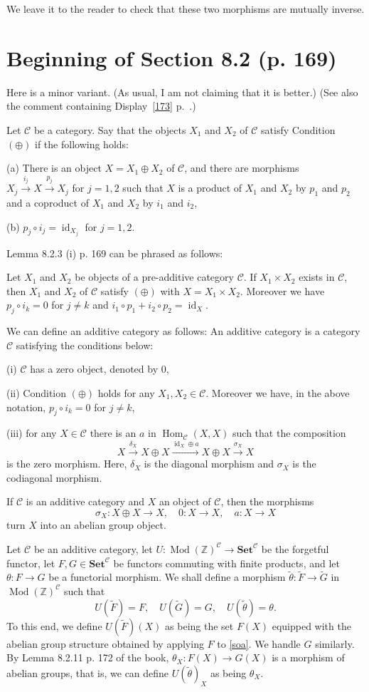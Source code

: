 \documentclass[12pt]{article}
\theoremstyle{remark}%
\newcommand{\n}{\noindent}
\newcommand{\C}{\mathcal C}
\newcommand{\Set}{\textbf{Set}}
\newcommand{\xr}{\xrightarrow}
\newcommand{\be}{\begin{equation}}
\newcommand{\ee}{\end{equation}}
\newcommand{\ccd}{the comment containing Display}
\DeclareMathOperator{\id}{id}
\DeclareMathOperator{\h}{Hom}
\DeclareMathOperator{\Mod}{Mod}
\begin{document}
We leave it to the reader to check that these two morphisms are mutually inverse. 
% 
\section{Beginning of Section 8.2 (p. 169)} \label{169}%
% 
Here is a minor variant. (As usual, I am not claiming that it is better.) (See also \ccd\ \eqref{173} p.~\pageref{173}.) 

Let $\C$ be a category. Say that the objects $X_1$ and $X_2$ of $\C$ satisfy Condition~$(\oplus)$ if the following holds: 

\n(a) There is an object $X=X_1\oplus X_2$ of $\C$, and there are morphisms $X_j\xr{i_j}X\xr{p_j}X_j$ for $j=1,2$ such that $X$ is a product of $X_1$ and $X_2$ by $p_1$ and $p_2$ and a coproduct of $X_1$ and $X_2$ by $i_1$ and $i_2$, 

\n(b) $p_j\circ i_j=\id_{X_j}$ for $j=1,2$. 

Lemma 8.2.3 (i) p. 169 can be phrased as follows: 

Let $X_1$ and $X_2$ be objects of a pre-additive category $\C$. If $X_1\times X_2$ exists in $\C$, then $X_1$ and $X_2$ of $\C$ satisfy $(\oplus)$ with $X=X_1\times X_2$. Moreover we have $p_j\circ i_k=0$ for $j\neq k$ and $i_1\circ p_1+i_2\circ p_2=\id_X$. 

We can define an additive category as follows: An additive category is a category $\C$ satisfying the conditions below: 

\n(i) $\C$ has a zero object, denoted by 0, 

\n(ii) Condition $(\oplus)$ holds for any $X_1,X_2\in\C$. Moreover we have, in the above notation, $p_j\circ i_k=0$ for $j\neq k$, 

\n(iii) for any $X\in\C$ there is an $a$ in $\h_\C(X,X)$ such that the composition 
$$ 
X\xr{\delta_X}X\oplus X\xr{\id_X\oplus a}X\oplus X\xr{\sigma_X}X 
$$ 
is the zero morphism. Here, $\delta_X$ is the diagonal morphism and $\sigma_X$ is the codiagonal morphism. 

If $\C$ is an additive category and $X$ an object of $\C$, then the morphisms 
% 
\be\label{soa} 
\sigma_X:X\oplus X\to X,\quad0:X\to X,\quad a:X\to X 
\ee 
%
turn $X$ into an abelian group object. 

Let $\C$ be an additive category, let $U:\Mod(\mathbb Z)^\C\to\Set^\C$ be the forgetful functor, let $F,G\in\Set^\C$ be functors commuting with finite products, and let $\theta:F\to G$ be a functorial morphism. We shall define a morphism $\widetilde\theta:\widetilde F\to\widetilde G$ in $\Mod(\mathbb Z)^\C$ such that 
$$ 
U(\widetilde F)=F,\quad U(\widetilde G)=G,\quad U(\widetilde\theta)=\theta. 
$$ 
To this end, we define $U(\widetilde F)(X)$ as being the set $F(X)$ equipped with the abelian group structure obtained by applying $F$ to \eqref{soa}. We handle $G$ similarly. By Lemma 8.2.11 p. 172 of the book, $\theta_X:F(X)\to G(X)$ is a morphism of abelian groups, that is, we can define $U(\widetilde\theta)_X$ as being $\theta_X$. 
\end{document}
